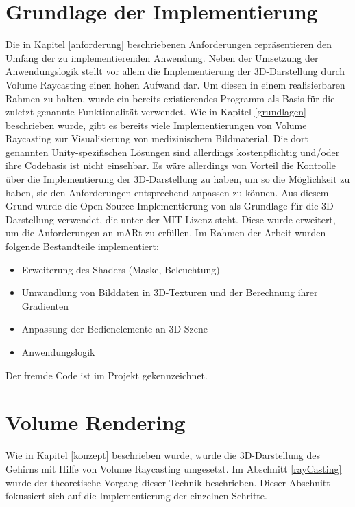 \section{Grundlage der Implementierung}

Die in Kapitel \ref{anforderung} beschriebenen Anforderungen repräsentieren den Umfang der zu implementierenden Anwendung. 
Neben der Umsetzung der Anwendungslogik stellt vor allem die Implementierung der 3D-Darstellung durch Volume Raycasting einen hohen Aufwand dar. Um diesen in einem realisierbaren Rahmen zu halten, wurde ein bereits existierendes Programm als Basis für die zuletzt genannte Funktionalität verwendet.
Wie in Kapitel \ref{grundlagen} beschrieben wurde, gibt es bereits viele Implementierungen von Volume Raycasting zur Visualisierung von medizinischem Bildmaterial. 
Die dort genannten Unity-spezifischen Lösungen sind allerdings kostenpflichtig und/oder ihre Codebasis ist nicht einsehbar. Es wäre allerdings von Vorteil die Kontrolle über die Implementierung der 3D-Darstellung zu haben, um so die Möglichkeit zu haben, sie den Anforderungen entsprechend anpassen zu können.
Aus diesem Grund wurde die Open-Source-Implementierung von \cite{volumeRenderingGit} als Grundlage für die 3D-Darstellung verwendet, die unter der MIT-Lizenz steht.
Diese wurde erweitert, um die Anforderungen an mARt zu erfüllen. 
Im Rahmen der Arbeit wurden folgende Bestandteile implementiert:

\begin{itemize}
\item Erweiterung des Shaders (Maske, Beleuchtung)
\item Umwandlung von Bilddaten in 3D-Texturen und der Berechnung ihrer Gradienten
\item Anpassung der Bedienelemente an 3D-Szene
\item Anwendungslogik
\end{itemize}
Der fremde Code ist im Projekt gekennzeichnet.

\section{Volume Rendering}

Wie in Kapitel \ref{konzept} beschrieben wurde, wurde die 3D-Darstellung des Gehirns mit Hilfe von Volume Raycasting umgesetzt. 
Im Abschnitt \ref{rayCasting} wurde der theoretische Vorgang dieser Technik beschrieben. Dieser Abschnitt fokussiert sich auf die Implementierung der einzelnen Schritte.

